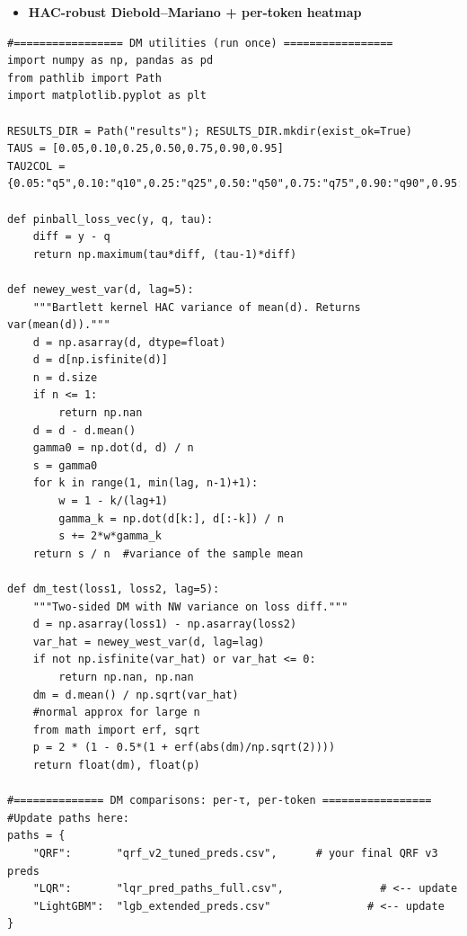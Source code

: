 \documentclass[
  a4paper,
  DIV=11,
  numbers=noendperiod]{scrreprt}
\providecommand{\tightlist}{%
  \setlength{\itemsep}{0pt}\setlength{\parskip}{0pt}}
\begin{document}
\begin{itemize}
\tightlist
\item
  \textbf{HAC-robust Diebold--Mariano + per-token heatmap}
\end{itemize}

\begin{verbatim}
#================= DM utilities (run once) =================
import numpy as np, pandas as pd
from pathlib import Path
import matplotlib.pyplot as plt

RESULTS_DIR = Path("results"); RESULTS_DIR.mkdir(exist_ok=True)
TAUS = [0.05,0.10,0.25,0.50,0.75,0.90,0.95]
TAU2COL = {0.05:"q5",0.10:"q10",0.25:"q25",0.50:"q50",0.75:"q75",0.90:"q90",0.95:"q95"}

def pinball_loss_vec(y, q, tau):
    diff = y - q
    return np.maximum(tau*diff, (tau-1)*diff)

def newey_west_var(d, lag=5):
    """Bartlett kernel HAC variance of mean(d). Returns var(mean(d))."""
    d = np.asarray(d, dtype=float)
    d = d[np.isfinite(d)]
    n = d.size
    if n <= 1: 
        return np.nan
    d = d - d.mean()
    gamma0 = np.dot(d, d) / n
    s = gamma0
    for k in range(1, min(lag, n-1)+1):
        w = 1 - k/(lag+1)
        gamma_k = np.dot(d[k:], d[:-k]) / n
        s += 2*w*gamma_k
    return s / n  #variance of the sample mean

def dm_test(loss1, loss2, lag=5):
    """Two-sided DM with NW variance on loss diff."""
    d = np.asarray(loss1) - np.asarray(loss2)
    var_hat = newey_west_var(d, lag=lag)
    if not np.isfinite(var_hat) or var_hat <= 0:
        return np.nan, np.nan
    dm = d.mean() / np.sqrt(var_hat)
    #normal approx for large n
    from math import erf, sqrt
    p = 2 * (1 - 0.5*(1 + erf(abs(dm)/np.sqrt(2))))
    return float(dm), float(p)

#============== DM comparisons: per-τ, per-token =================
#Update paths here:
paths = {
    "QRF":       "qrf_v2_tuned_preds.csv",      # your final QRF v3 preds
    "LQR":       "lqr_pred_paths_full.csv",               # <-- update
    "LightGBM":  "lgb_extended_preds.csv"               # <-- update
}


\end{verbatim}
\end{document}
